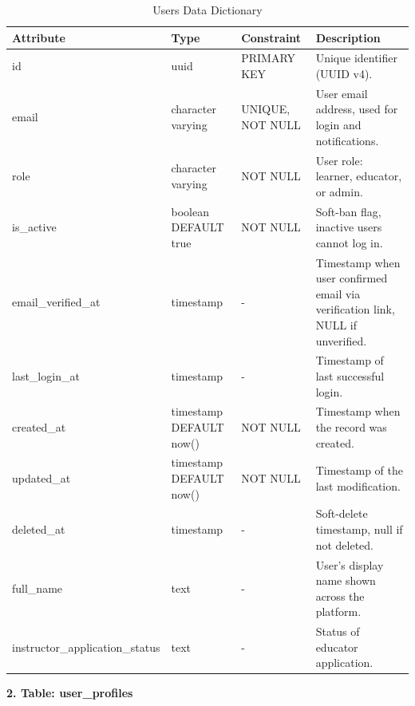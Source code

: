 \documentclass[12pt, oneside]{article} %
\newcommand{\tabbreak}{\hyphenpenalty=200\exhyphenpenalty=200\tolerance=4000\hbadness=10000\hspace{0pt}}
\begin{document}
\begin{table}[H]
\caption{Users Data Dictionary}
\label{tab:dd_users}
\vspace{-4mm}
\begin{center}
\renewcommand{\arraystretch}{1.15}
\scriptsize
\begin{tabular}{|>{\raggedright\arraybackslash\tabbreak}p{2.67cm}|>{\raggedright\arraybackslash\tabbreak}p{2.93cm}|>{\raggedright\arraybackslash\tabbreak}p{2.67cm}|>{\raggedright\arraybackslash\tabbreak}p{4.51cm}|}
\hline
\textbf{Attribute} & \textbf{Type} & \textbf{Constraint} & \textbf{Description} \\ \hline
id & uuid & PRIMARY KEY & Unique identifier (UUID v4). \\ \hline
email & character varying & UNIQUE, NOT NULL & User email address, used for login and notifications. \\ \hline
role & character varying & NOT NULL & User role: learner, educator, or admin. \\ \hline
is\_active & boolean DEFAULT true & NOT NULL & Soft-ban flag, inactive users cannot log in. \\ \hline
email\_verified\_at & timestamp & - & Timestamp when user confirmed email via verification link, NULL if unverified. \\ \hline
last\_login\_at & timestamp & - & Timestamp of last successful login. \\ \hline
created\_at & timestamp DEFAULT now() & NOT NULL & Timestamp when the record was created. \\ \hline
updated\_at & timestamp DEFAULT now() & NOT NULL & Timestamp of the last modification. \\ \hline
deleted\_at & timestamp & - & Soft-delete timestamp, null if not deleted. \\ \hline
full\_name & text & - & User's display name shown across the platform. \\ \hline
instructor\_application\_status & text & - & Status of educator application. \\ \hline
\end{tabular}
\end{center}
\end{table}

\textbf{2. Table: user\_profiles}
\end{document}
